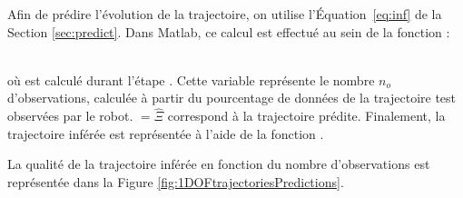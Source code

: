 \documentclass[utf8]{frontiersSCNS} %
\newcommand{\rev}[1]{\textcolor{blue}{#1}}
\begin{document}
Afin de prédire l'évolution de la trajectoire, on utilise l'Équation~\ref{eq:inf} de la Section \ref{sec:predict}. Dans Matlab, ce calcul est effectué au sein de la fonction :

\\
où  est calculé durant l'étape . Cette variable représente le nombre $n_o$ d'observations, calculée à partir du pourcentage  de données de la trajectoire test observées par le robot. $= \hat{\Xi}$ correspond à la trajectoire prédite.
Finalement, la trajectoire inférée est représentée à l'aide de  la fonction .

La qualité de la trajectoire inférée en fonction du nombre d'observations est représentée dans la Figure \ref{fig:1DOFtrajectoriesPredictions}.
\end{document}
